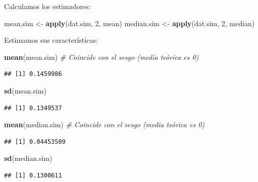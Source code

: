 \documentclass[
]{book}
\newenvironment{Shaded}{\begin{snugshade}}{\end{snugshade}}
\newcommand{\CommentTok}[1]{\textcolor[rgb]{0.56,0.35,0.01}{\textit{#1}}}
\newcommand{\DecValTok}[1]{\textcolor[rgb]{0.00,0.00,0.81}{#1}}
\newcommand{\KeywordTok}[1]{\textcolor[rgb]{0.13,0.29,0.53}{\textbf{#1}}}
\newcommand{\NormalTok}[1]{#1}
\newcommand{\StringTok}[1]{\textcolor[rgb]{0.31,0.60,0.02}{#1}}
\theoremstyle{break}
\theoremstyle{definition}
\theoremstyle{definition}
\theoremstyle{definition}
\theoremstyle{remark}
\begin{document}
\begin{enumerate}
  Calculamos los estimadores:

\begin{Shaded}
\begin{Highlighting}[]
\NormalTok{mean.sim <-}\StringTok{ }\KeywordTok{apply}\NormalTok{(dat.sim, }\DecValTok{2}\NormalTok{, mean)}
\NormalTok{median.sim <-}\StringTok{ }\KeywordTok{apply}\NormalTok{(dat.sim, }\DecValTok{2}\NormalTok{, median)}
\end{Highlighting}
\end{Shaded}

  Estimamos sus características:

\begin{Shaded}
\begin{Highlighting}[]
\KeywordTok{mean}\NormalTok{(mean.sim) }\CommentTok{# Coincide con el sesgo (media teórica es 0)}
\end{Highlighting}
\end{Shaded}

\begin{verbatim}
## [1] 0.1459986
\end{verbatim}

\begin{Shaded}
\begin{Highlighting}[]
\KeywordTok{sd}\NormalTok{(mean.sim)}
\end{Highlighting}
\end{Shaded}

\begin{verbatim}
## [1] 0.1349537
\end{verbatim}

\begin{Shaded}
\begin{Highlighting}[]
\KeywordTok{mean}\NormalTok{(median.sim) }\CommentTok{# Coincide con el sesgo (media teórica es 0)}
\end{Highlighting}
\end{Shaded}

\begin{verbatim}
## [1] 0.04453509
\end{verbatim}

\begin{Shaded}
\begin{Highlighting}[]
\KeywordTok{sd}\NormalTok{(median.sim)}
\end{Highlighting}
\end{Shaded}

\begin{verbatim}
## [1] 0.1300611
\end{verbatim}


\end{enumerate}
\end{document}
